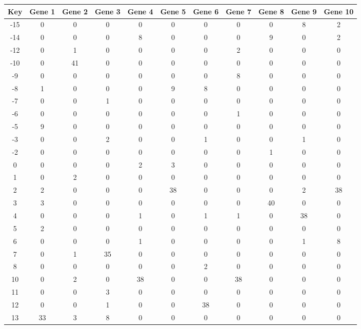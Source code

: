 \begin{tabular}{|c|c|c|c|c|c|c|c|c|c|c|}
\hline
Key & Gene 1 & Gene 2 & Gene 3 & Gene 4 & Gene 5 & Gene 6 & Gene 7 & Gene 8 & Gene 9 & Gene 10 \\
\hline
-15 & 0 & 0 & 0 & 0 & 0 & 0 & 0 & 0 & 8 & 2 \\
-14 & 0 & 0 & 0 & 8 & 0 & 0 & 0 & 9 & 0 & 2 \\
-12 & 0 & 1 & 0 & 0 & 0 & 0 & 2 & 0 & 0 & 0 \\
-10 & 0 & 41 & 0 & 0 & 0 & 0 & 0 & 0 & 0 & 0 \\
-9 & 0 & 0 & 0 & 0 & 0 & 0 & 8 & 0 & 0 & 0 \\
-8 & 1 & 0 & 0 & 0 & 9 & 8 & 0 & 0 & 0 & 0 \\
-7 & 0 & 0 & 1 & 0 & 0 & 0 & 0 & 0 & 0 & 0 \\
-6 & 0 & 0 & 0 & 0 & 0 & 0 & 1 & 0 & 0 & 0 \\
-5 & 9 & 0 & 0 & 0 & 0 & 0 & 0 & 0 & 0 & 0 \\
-3 & 0 & 0 & 2 & 0 & 0 & 1 & 0 & 0 & 1 & 0 \\
-2 & 0 & 0 & 0 & 0 & 0 & 0 & 0 & 1 & 0 & 0 \\
0 & 0 & 0 & 0 & 2 & 3 & 0 & 0 & 0 & 0 & 0 \\
1 & 0 & 2 & 0 & 0 & 0 & 0 & 0 & 0 & 0 & 0 \\
2 & 2 & 0 & 0 & 0 & 38 & 0 & 0 & 0 & 2 & 38 \\
3 & 3 & 0 & 0 & 0 & 0 & 0 & 0 & 40 & 0 & 0 \\
4 & 0 & 0 & 0 & 1 & 0 & 1 & 1 & 0 & 38 & 0 \\
5 & 2 & 0 & 0 & 0 & 0 & 0 & 0 & 0 & 0 & 0 \\
6 & 0 & 0 & 0 & 1 & 0 & 0 & 0 & 0 & 1 & 8 \\
7 & 0 & 1 & 35 & 0 & 0 & 0 & 0 & 0 & 0 & 0 \\
8 & 0 & 0 & 0 & 0 & 0 & 2 & 0 & 0 & 0 & 0 \\
10 & 0 & 2 & 0 & 38 & 0 & 0 & 38 & 0 & 0 & 0 \\
11 & 0 & 0 & 3 & 0 & 0 & 0 & 0 & 0 & 0 & 0 \\
12 & 0 & 0 & 1 & 0 & 0 & 38 & 0 & 0 & 0 & 0 \\
13 & 33 & 3 & 8 & 0 & 0 & 0 & 0 & 0 & 0 & 0 \\
\hline
\end{tabular}